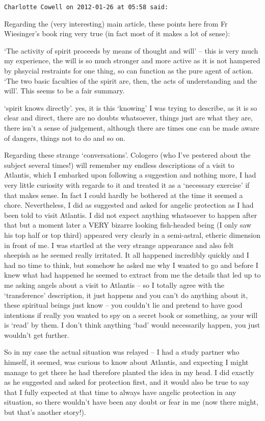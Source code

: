\begin{footnotesize}
\begin{sffamily}
\hfill

\texttt{Charlotte Cowell on 2012-01-26 at 05:58 said: }

Regarding the (very interesting) main article, these points here from Fr Wiesinger's book ring very true (in fact most of it makes a lot of sense): 

`The activity of spirit proceeds by means of thought and will’ – this is very much my experience, the will is so much stronger and more active as it is not hampered by phsycial restraints for one thing, so can function as the pure agent of action. `The two basic faculties of the spirit are, then, the acts of understanding and the will'. This seems to be a fair summary.

`spirit knows directly'. yes, it is this `knowing' I was trying to describe, as it is so clear and direct, there are no doubts whatsoever, things just are what they are, there isn't a sense of judgement, although there are times one can be made aware of dangers, things not to do and so on. 

Regarding these strange `conversations'. Cologero (who I've pestered about the subject several times!) will remember my endless descriptions of a visit to Atlantis, which I embarked upon following a suggestion and nothing more, I had very little curiosity with regards to it and treated it as a `necessary exercise' if that makes sense. In fact I could hardly be bothered at the time it seemed a chore. Nevertheless, I did as suggested and asked for angelic protection as I had been told to visit Atlantis. I did not expect anything whatsoever to happen after that but a moment later a VERY bizarre looking fish-headed being (I only saw his top half or top third) appeared very clearly in a semi-astral, etheric dimension in front of me. I was startled at the very strange appearance and also felt sheepish as he seemed really irritated. It all happened incredibly quickly and I had no time to think, but somehow he asked me why I wanted to go and before I knew what had happened he seemed to extract from me the details that led up to me asking angels about a visit to Atlantis – so I totally agree with the `transference' description, it just happens and you can't do anything about it, these spiritual beings just know – you couldn't lie and pretend to have good intentions if really you wanted to spy on a secret book or something, as your will is `read' by them. I don't think anything `bad' would necessarily happen, you just wouldn't get further.

So in my case the actual situation was relayed – I had a study partner who himself, it seemed, was curious to know about Atlantis, and expecting I might manage to get there he had therefore planted the idea in my head. I did exactly as he suggested and asked for protection first, and it would also be true to say that I fully expected at that time to always have angelic protection in any situation, so there wouldn't have been any doubt or fear in me (now there might, but that's another story!).


\end{sffamily}
\end{footnotesize}
